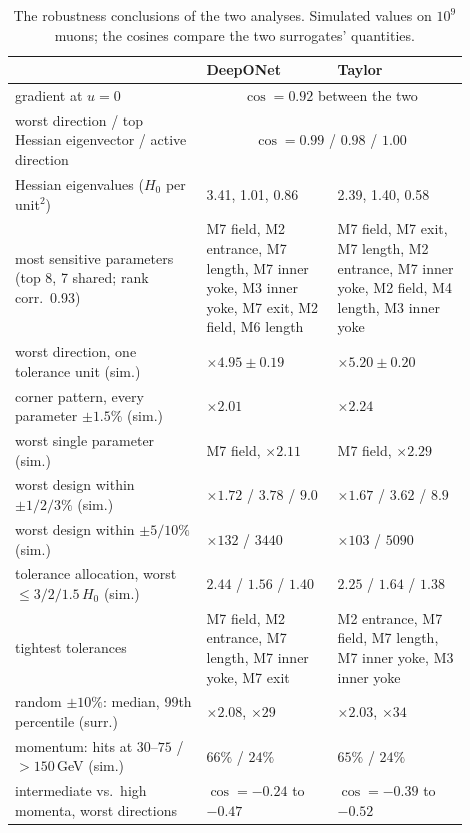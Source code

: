 \documentclass[11pt,a4paper]{article}
\begin{document}
\begin{table}[h]
\centering
\caption{The robustness conclusions of the two analyses. Simulated values on $10^9$ muons;
the cosines compare the two surrogates' quantities.}
\label{tab:conclusions}
\small
\begin{tabular}{p{0.38\linewidth}p{0.26\linewidth}p{0.26\linewidth}}
\toprule
 & DeepONet & Taylor \\
\midrule
gradient at $u=0$ & \multicolumn{2}{c}{$\cos=0.92$ between the two} \\
worst direction / top Hessian eigenvector / active direction & \multicolumn{2}{c}{$\cos=0.99$ / $0.98$ / $1.00$} \\
Hessian eigenvalues ($H_0$ per unit$^2$) & 3.41, 1.01, 0.86 & 2.39, 1.40, 0.58 \\
most sensitive parameters (top 8, 7 shared; rank corr.\ 0.93) & M7 field, M2 entrance, M7 length, M7 inner yoke, M3 inner yoke, M7 exit, M2 field, M6 length & M7 field, M7 exit, M7 length, M2 entrance, M7 inner yoke, M2 field, M4 length, M3 inner yoke \\
worst direction, one tolerance unit (sim.) & $\times4.95\pm0.19$ & $\times5.20\pm0.20$ \\
corner pattern, every parameter $\pm1.5\%$ (sim.) & $\times2.01$ & $\times2.24$ \\
worst single parameter (sim.) & M7 field, $\times2.11$ & M7 field, $\times2.29$ \\
worst design within $\pm1/2/3\%$ (sim.) & $\times1.72$ / $3.78$ / $9.0$ & $\times1.67$ / $3.62$ / $8.9$ \\
worst design within $\pm5/10\%$ (sim.) & $\times132$ / $3440$ & $\times103$ / $5090$ \\
tolerance allocation, worst $\le3/2/1.5\,H_0$ (sim.) & $2.44$ / $1.56$ / $1.40$ & $2.25$ / $1.64$ / $1.38$ \\
tightest tolerances & M7 field, M2 entrance, M7 length, M7 inner yoke, M7 exit & M2 entrance, M7 field, M7 length, M7 inner yoke, M3 inner yoke \\
random $\pm10\%$: median, 99th percentile (surr.) & $\times2.08$, $\times29$ & $\times2.03$, $\times34$ \\
momentum: hits at $30$--$75$ / $>150$\,GeV (sim.) & $66\%$ / $24\%$ & $65\%$ / $24\%$ \\
intermediate vs.\ high momenta, worst directions & $\cos=-0.24$ to $-0.47$ & $\cos=-0.39$ to $-0.52$ \\
\bottomrule
\end{tabular}
\end{table}
\end{document}
